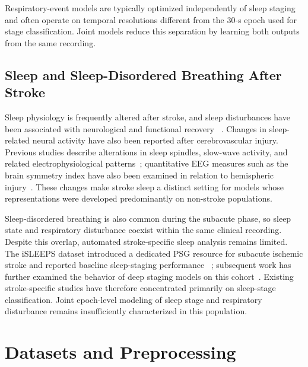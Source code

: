 \documentclass[a4paper,fleqn]{cas-sc}
\begin{document}
Respiratory-event models are typically optimized independently of sleep
staging and often operate on temporal resolutions different from the 30-s epoch
used for stage classification. Joint models reduce this separation by learning
both outputs from the same recording.

\subsection{Sleep and Sleep-Disordered Breathing After Stroke}

Sleep physiology is frequently altered after stroke, and sleep disturbances
have been associated with neurological and functional recovery
~\cite{bassetti2006sleep,denis2024sleep,tellenbach2023brainstem}. Changes in
sleep-related neural activity have also been reported after cerebrovascular
injury. Previous studies describe alterations in sleep spindles, slow-wave activity, and related electrophysiological patterns~\cite{gottselig2002stroke,fernandez2019spindles,simpson2023laterality,facchin2020slowwaves,zheng2025spindles}; quantitative EEG measures such as the brain symmetry index have also been examined in relation to hemispheric injury~\cite{anastasi2017bsi}. These changes make
stroke sleep a distinct setting for models whose representations were
developed predominantly on non-stroke populations.

Sleep-disordered breathing is also common during the subacute phase, so sleep
state and respiratory disturbance coexist within the same clinical recording.
Despite this overlap, automated stroke-specific sleep analysis remains limited.
The iSLEEPS dataset introduced a dedicated PSG resource for subacute ischemic
stroke and reported baseline sleep-staging performance
~\cite{maiti2026isleeps}; subsequent work has further examined the behavior of
deep staging models on this cohort~\cite{bose2026gap,alhazmi2026sleepstagenet}. Existing stroke-specific
studies have therefore concentrated primarily on sleep-stage classification.
Joint epoch-level modeling of sleep stage and respiratory disturbance remains
insufficiently characterized in this population.

\section{Datasets and Preprocessing}
\label{sec:data}
\end{document}
